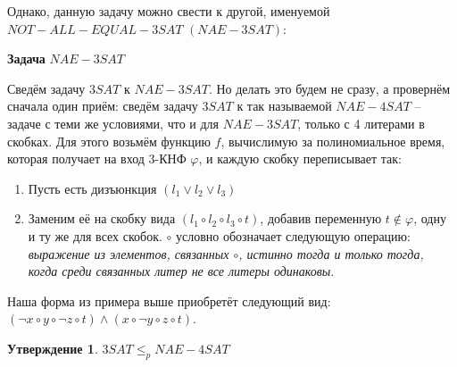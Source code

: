 \documentclass[a4paper,12pt]{article}
\newtheorem{statement}{Утверждение}
\begin{document}
Однако, данную задачу можно свести к другой, именуемой $NOT-ALL-EQUAL-3SAT$ $(NAE-3SAT)$:
\begin{algorithm}[H]
    \caption{\textbf{Задача} $NAE-3SAT$}
    \begin{algorithmic}
    \end{algorithmic}
\end{algorithm}
Сведём задачу $3SAT$ к $NAE-3SAT$. Но делать это будем не сразу, а провернём сначала один приём: сведём задачу $3SAT$ к так называемой $NAE-4SAT$ -- задаче с теми же условиями, что и для $NAE-3SAT$, только с 4 литерами в скобках. Для этого возьмём функцию $f$, вычислимую за полиномиальное время, которая получает на вход 3-КНФ $\varphi$, и каждую скобку переписывает так:
\begin{enumerate}
    \item Пусть есть дизъюнкция $(l_1 \vee l_2 \vee l_3)$
    \item Заменим её на скобку вида $(l_1 \circ l_2 \circ l_3 \circ t)$, добавив переменную $t \notin \varphi$, одну и ту же для всех скобок. $\circ$ условно обозначает следующую операцию: \textit{выражение из элементов, связанных $\circ$, истинно тогда и только тогда, когда среди связанных литер не все литеры одинаковы}.
\end{enumerate}
Наша форма из примера выше приобретёт следующий вид: $(\neg x \circ y \circ \neg z\circ t)\wedge(x \circ \neg y \circ z \circ t)$.
\begin{statement}
    $3SAT \leqslant_p NAE-4SAT$
\end{statement}
\end{document}
